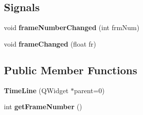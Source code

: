 \subsection*{\-Signals}
\begin{DoxyCompactItemize}
\item 
\hypertarget{class_time_line_acf268dd05899f9b6bf4f3382dfbd2885}{
void {\bfseries frame\-Number\-Changed} (int frm\-Num)}
\label{class_time_line_acf268dd05899f9b6bf4f3382dfbd2885}

\item 
\hypertarget{class_time_line_a6407008e3226311ae3dd8d09e5e34725}{
void {\bfseries frame\-Changed} (float fr)}
\label{class_time_line_a6407008e3226311ae3dd8d09e5e34725}

\end{DoxyCompactItemize}
\subsection*{\-Public \-Member \-Functions}
\begin{DoxyCompactItemize}
\item 
\hypertarget{class_time_line_a0b5ca6f90531cacde3c901031666b7dc}{
{\bfseries \-Time\-Line} (\-Q\-Widget $\ast$parent=0)}
\label{class_time_line_a0b5ca6f90531cacde3c901031666b7dc}

\item 
\hypertarget{class_time_line_a23b5fb5e359025d5600122472dc595f2}{
int {\bfseries get\-Frame\-Number} ()}
\label{class_time_line_a23b5fb5e359025d5600122472dc595f2}

\end{DoxyCompactItemize}
